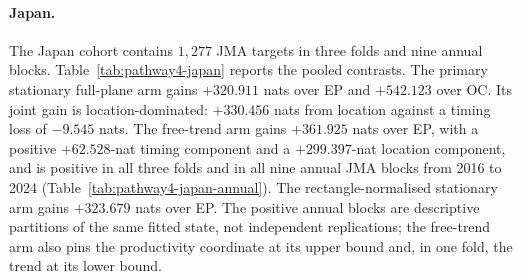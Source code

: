 \begin{table}[htbp]\centering\scriptsize
{}
\caption{New Zealand single-pass transfer, $612$ targets in three folds. Entries are held-out log-score contrasts in nats; positive favours EP+ over the named archived procedure. \texttt{plane} and \texttt{rect} denote full-plane and observation-rectangle normalisation; \texttt{T1} is the stationary $d=0$ arm and \texttt{T0} the free-trend arm. Timing, location and joint are separate score components, and joint equals timing plus conditional location because the mark contribution is shared.}
\label{tab:pathway4-nz}
\end{table}

\paragraph{Japan.}
The Japan cohort contains $1{,}277$ JMA targets in three folds and nine annual blocks. Table~\ref{tab:pathway4-japan} reports the pooled contrasts. The primary stationary full-plane arm gains $+320.911$ nats over EP and $+542.123$ over OC. Its joint gain is location-dominated: $+330.456$ nats from location against a timing loss of $-9.545$ nats. The free-trend arm gains $+361.925$ nats over EP, with a positive $+62.528$-nat timing component and a $+299.397$-nat location component, and is positive in all three folds and in all nine annual JMA blocks from 2016 to 2024 (Table~\ref{tab:pathway4-japan-annual}). The rectangle-normalised stationary arm gains $+323.679$ nats over EP. The positive annual blocks are descriptive partitions of the same fitted state, not independent replications; the free-trend arm also pins the productivity coordinate at its upper bound and, in one fold, the trend at its lower bound.

